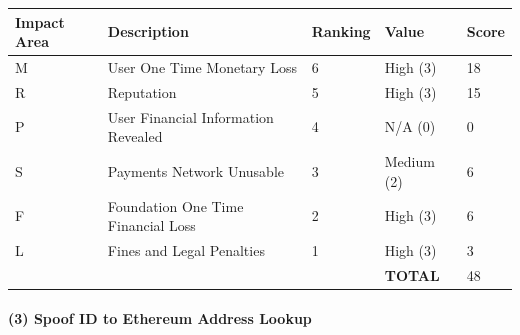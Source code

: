 \documentclass[a4paper,12pt]{article} %
\begin{document}
{\begin{center}
\begin{tabular}{ | l | l | l | l | l |}
  \hline
  \textbf{Impact Area} & \textbf{Description} & \textbf{Ranking} & \textbf{Value} & \textbf{Score}
  \\ \hline
  M & User One Time Monetary Loss			& 6	& High (3)		& 18
  \\ \hline
  R & Reputation		& 5	& High (3)		& 15
  \\ \hline
  P & User Financial Information Revealed		& 4	& N/A (0)		& 0
  \\ \hline
  S & Payments Network Unusable					& 3	& Medium (2)	& 6
  \\ \hline
  F & Foundation One Time Financial Loss	& 2	& High (3)		& 6
  \\ \hline
  L & Fines and Legal Penalties						& 1	& High (3)		& 3
  \\ \hline
  & & & \textbf{TOTAL} & 48
  \\ \hline
\end{tabular}
\end{center}
\label{tab:severityProgrammingErrorInContract}

\paragraph{(3) Spoof ID to Ethereum Address Lookup }

}
\end{document}
